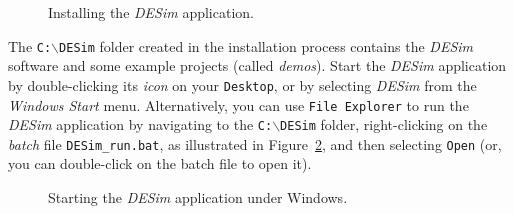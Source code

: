 \documentclass[11pt, twoside, pdftex]{article}
\begin{document}
\begin{figure}[h]
	\begin{center}
        \setlength{\fboxsep}{0pt}
	\end{center}
          \caption{Installing the {\it DESim} application.}
	\label{fig:install}
\end{figure}

The \texttt{C:$\backslash$DESim} folder created in the installation process
contains the {\it DESim} software and some
example projects (called {\it demos}). Start the {\it DESim} application by double-clicking its
{\it icon} on your \texttt{Desktop}, or by selecting {\it DESim} from the 
{\it Windows Start} menu. Alternatively, you can use \texttt{File Explorer} to run the 
{\it DESim} application by navigating to the \texttt{C:$\backslash$DESim} folder, 
right-clicking on the {\it batch} file \texttt{DESim\_run.bat}, as illustrated in 
Figure~\ref{fig:open}, and then selecting \texttt{Open} (or, you can double-click on the 
batch file to open it).

\begin{figure}[h]
	\begin{center}
            \setlength{\fboxsep}{0pt}
	\end{center}
          \caption{Starting the {\it DESim} application under Windows.}
	\label{fig:open}
\end{figure}
\end{document}
